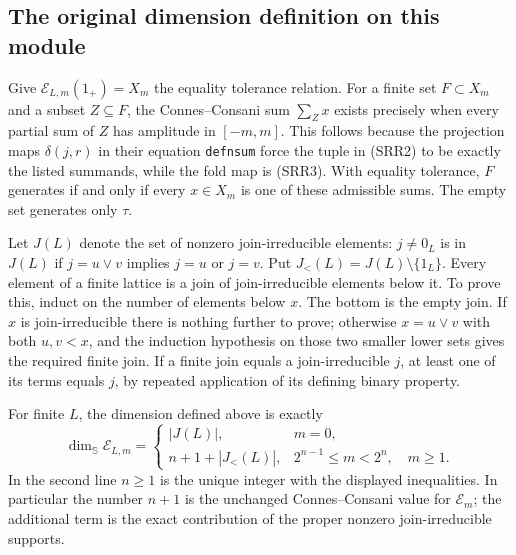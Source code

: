 \subsection{The original dimension definition on this module}

Give $\mathcal E_{L,m}(1_+)=X_m$ the equality tolerance relation.
For a finite set $F\subset X_m$ and a subset $Z\subseteq F$, the
Connes--Consani sum $\sum_Z x$ exists precisely when every partial
sum of $Z$ has amplitude in $[-m,m]$. This follows because the
projection maps $\delta(j,r)$ in their equation \texttt{defnsum}
force the tuple in (SRR2) to be exactly the listed summands, while
the fold map is (SRR3). With equality tolerance, $F$ generates if
and only if every $x\in X_m$ is one of these admissible sums.
The empty set generates only $\tau$.

Let $J(L)$ denote the set of nonzero join-irreducible elements:
$j\ne0_L$ is in $J(L)$ if $j=u\vee v$ implies $j=u$ or $j=v$.
Put $J_{<}(L)=J(L)\setminus\{1_L\}$.
Every element of a finite lattice is a join of join-irreducible
elements below it. To prove this, induct on the number of elements
below $x$. The bottom is the empty join. If $x$ is join-irreducible
there is nothing further to prove; otherwise $x=u\vee v$ with both
$u,v<x$, and the induction hypothesis on those two smaller lower
sets gives the required finite join. If a finite join equals a
join-irreducible $j$, at least one of its terms equals $j$, by repeated
application of its defining binary property.

\begin{theorem}\label{thm:srr-dimension}
For finite $L$, the dimension defined above is exactly
\begin{equation}\tag{SRR6}
 \dim_{\mathbb S}\mathcal E_{L,m}=
 \begin{cases}
 |J(L)|,&m=0,\\
 n+1+|J_{<}(L)|,&2^{n-1}\le m<2^n,\quad m\ge1.
 \end{cases}
\end{equation}
In the second line $n\ge1$ is the unique integer with the displayed
inequalities. In particular the number $n+1$ is the unchanged
Connes--Consani value for $\mathcal E_m$; the additional term is the
exact contribution of the proper nonzero join-irreducible supports.
\end{theorem}

